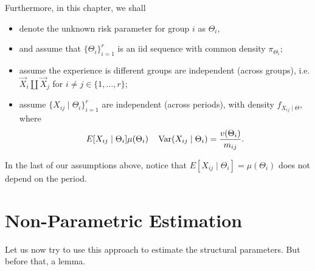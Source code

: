 \documentclass[notoc,notitlepage]{tufte-book}
\begin{document}
\begin{defn}
  Furthermore, in this chapter, we shall
  \begin{itemize}
    \item denote the unknown risk parameter for group $i$ as $\Theta_i$,
    \item and assume that $\{ \Theta_i \}_{i=1}^{r}$ is an iid sequence
      with common density $\pi_{\Theta_i}$;
    \item assume the experience is different groups are independent
      (across groups), i.e. 
      $\vec{X}_i \coprod \vec{X}_j$ for $i \neq j \in \{1, \ldots, r\}$;
    \item assume $\{ X_{ij} \mid \Theta_i \}_{i=1}^{r}$ are independent
      (across periods), with density $f_{X_{ij} \mid \Theta}$, where
      \begin{equation*}
        E[X_{ij} \mid \Theta_i] \mu(\Theta_i) \quad
        \operatorname{Var}(X_{ij} \mid \Theta_i) = \frac{v(\Theta_i)}{m_{ij}}.
      \end{equation*}
  \end{itemize}
\end{defn}


\begin{note}
  In the last of our assumptions above,
  notice that $E[X_{ij} \mid \Theta_i] = \mu(\Theta_i)$
  does not depend on the period.
\end{note}


\section{Non-Parametric Estimation}%
\label{sec:non_parametric_estimation}

Let us now try to use this approach
to estimate the structural parameters.
But before that, a lemma.
\end{document}
